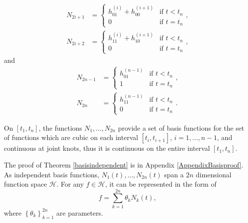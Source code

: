 \begin{align*}
N_{2i+1}&=
\begin{cases}
h_{01}^{(i)}+h_{00}^{(i+1)}  & \mbox{if $t<t_n$}\\
0 &  \mbox{if $t=t_n$}
\end{cases},\\
N_{2i+2}&=
\begin{cases}
 h_{11}^{(i)}+h_{10}^{(i+1)} & \mbox{if $t<t_n$}\\
0 & \mbox{if $t=t_n$}
\end{cases},
\end{align*}
and
\begin{align*}
N_{2n-1} &= 
\begin{cases}
h_{01}^{(n-1)} & \mbox{if $t<t_n$}\\ 
1 & \mbox{if $t=t_n$}
\end{cases},\\
N_{2n} &= 
\begin{cases}
h_{11}^{(n-1)} & \mbox{if $t<t_n$}\\
0 & \mbox{if $t=t_n$}
\end{cases}.
\end{align*}

\begin{theorem}\label{basisindependent}
On $[t_1,t_n]$, the functions $N_1,\ldots,N_{2n}$ provide a set of basis functions for the set of functions which are cubic on each interval $[t_i,t_{i+1}]$, $i=1, \ldots, n-1$, and continuous at joint knots, thus it is continuous on the entire interval $[t_1,t_n]$.
\end{theorem}
The proof of Theorem \ref{basisindependent} is in Appendix \ref{AppendixBasisproof}.
As independent basis functions, $N_1(t), \ldots, N_{2n}(t)$ span a $2n$ dimensional function space $\mathcal{H}$. For any $f \in \mathcal{H}$, it can be represented in the form of
\begin{equation}
f=\sum_{k=1}^{2n} \theta_k N_k(t),
\end{equation}
where $\left\lbrace \theta_k\right\rbrace_{k=1}^{2n}$ are parameters.

